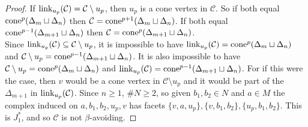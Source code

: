 \documentclass[letterpaper,12pt]{amsart}
\theoremstyle{plain}
\theoremstyle{definition}
\theoremstyle{remark}
\newcommand{\link}{\textnormal{link}}
\newcommand{\cone}{\textnormal{cone}}
\begin{document}
\begin{proof}
	If $\link_{u_p}(\mathcal{C}) = \mathcal{C}\setminus u_p$, then $u_p$ is a cone vertex in $\mathcal{C}$.
	So if both equal $\cone^p(\Delta_m \sqcup \Delta_n)$ then
	$\mathcal{C} = \cone^{p+1}(\Delta_m \sqcup \Delta_n)$.
	If both equal $\cone^{p-1}(\Delta_{m+1}\sqcup \Delta_n)$
	then $\mathcal{C} = \cone^{p}(\Delta_{m+1}\sqcup \Delta_n)$.
	\\
	\indent
	Since $\link_{u_p}(\mathcal{C}) \subseteq \mathcal{C}\setminus u_p$,
	it is impossible to have $\link_{u_p}(\mathcal{C}) = \cone^p(\Delta_m \sqcup \Delta_n)$
	and $\mathcal{C}\setminus u_p = \cone^{p-1}(\Delta_{m+1} \sqcup \Delta_n)$.
	It is also impossible to have $\mathcal{C}\setminus u_p = \cone^p(\Delta_m \sqcup \Delta_n)$
	and $\link_{u_p}(\mathcal{C}) = \cone^{p-1}(\Delta_{m+1} \sqcup \Delta_n)$.
	For if this were the case,
	then $v$ would be a cone vertex in $\mathcal{C}\setminus u_p$
	and it would be part of the $\Delta_{m+1}$ in $\link_{u_p}(\mathcal{C})$.
	Since $n \ge 1$, $\# N \ge 2$, so given $b_1,b_2 \in N$ and $a \in M$ the complex induced
	on $a,b_1,b_2,u_p,v$ has facets $\{v,a,u_p\},\{v,b_1,b_2\},\{u_p,b_1,b_2\}$.
	This is $J_1^*$, and so $\mathcal{C}$ is not $\beta$-avoiding.
\end{proof}
\end{document}
